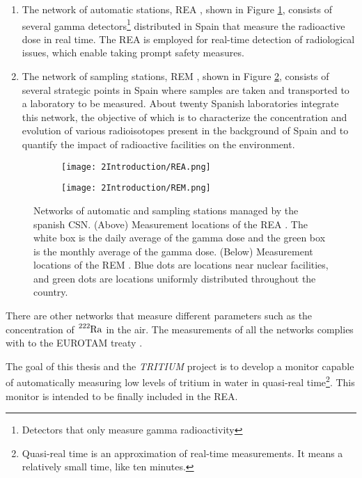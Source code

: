 \begin{enumerate}
\begin{enumerate}
\item{} The network of automatic stations, REA \cite{REA}, shown in Figure \ref{subfig:REA}, consists of several gamma detectors\footnote{Detectors that only measure gamma radioactivity} distributed in Spain that measure the radioactive dose in real time. The REA is employed for real-time detection of radiological issues, which enable taking prompt safety measures.

\item{} The network of sampling stations, REM \cite{REM}, shown in Figure \ref{subfig:REM}, consists of several strategic points in Spain where samples are taken and transported to a laboratory to be measured. About twenty Spanish laboratories integrate this network, the objective of which is to characterize the concentration and evolution of various radioisotopes present in the background of Spain and to quantify the impact of radioactive facilities on the environment.
\end{enumerate}

\begin{figure}
\centering
    \begin{subfigure}[b]{0.7\textwidth}
    \centering
    \texttt{[image: 2Introduction/REA.png]}  
        \caption{}\label{subfig:REA}
    \end{subfigure}
    \hfill
    \begin{subfigure}[b]{0.7\textwidth}
    \centering
    \texttt{[image: 2Introduction/REM.png]}  
    \caption{\label{subfig:REM}}
    \end{subfigure}
 \caption{Networks of automatic and sampling stations managed by the spanish CSN. (Above) Measurement locations of the REA \cite{REA}. The white box is the daily average of the gamma dose and the green box is the monthly average of the gamma dose. (Below) Measurement locations of the REM \cite{REM}. Blue dots are locations near nuclear facilities, and green dots are locations uniformly distributed throughout the country.}
 \label{fig:NetworksCSN}
\end{figure}

There are other networks that measure different parameters such as the concentration of $\ce{^{222}Ra}$ in the air. The measurements of all the networks complies with to the EUROTAM treaty \cite{100BqL}.
\end{enumerate}

The goal of this thesis and the \textit{TRITIUM} project is to develop a monitor capable of automatically measuring low levels of tritium in water in quasi-real time\footnote{Quasi-real time is an approximation of real-time measurements. It means a relatively small time, like ten minutes.}. This monitor is intended to be finally included in the REA.

